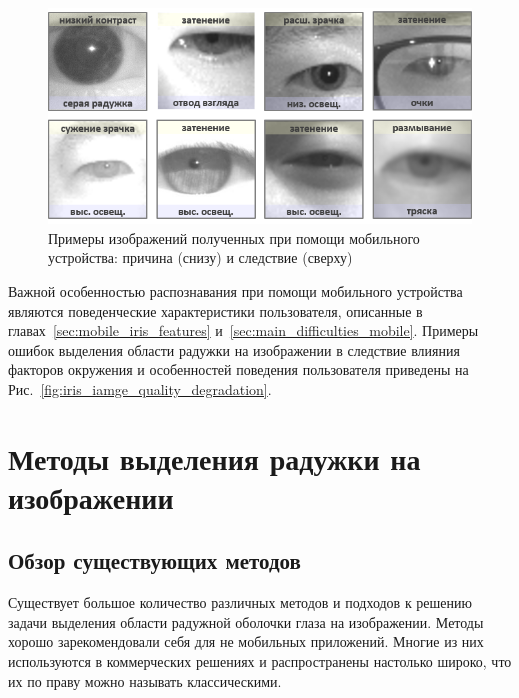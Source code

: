 \begin{figure}[t!]
	\centering
	\includegraphics[width=0.95\columnwidth]{pictures/iris-mobile-img-examples.png}
	\caption{Примеры изображений полученных при помощи мобильного устройства: причина (снизу) и следствие (сверху)}
	\label{fig:iris-mobile-img-examples}
\end{figure}

Важной особенностью распознавания при помощи мобильного устройства являются поведенческие характеристики пользователя, описанные в главах~\ref{sec:mobile_iris_features} и~\ref{sec:main_difficulties_mobile}. Примеры ошибок выделения области радужки на изображении в следствие влияния факторов окружения и особенностей поведения пользователя приведены на Рис.~\ref{fig:iris_iamge_quality_degradation}.

\section{Методы выделения радужки на изображении}
\label{sec:segm_method}

\subsection{Обзор существующих методов}
\label{sec:segm_existing_app_overview}

Существует большое количество различных методов и подходов к решению задачи выделения области радужной оболочки глаза на изображении. Методы хорошо зарекомендовали себя для не мобильных приложений. Многие из них используются в коммерческих решениях и распространены настолько широко, что их по праву можно называть классическими.

